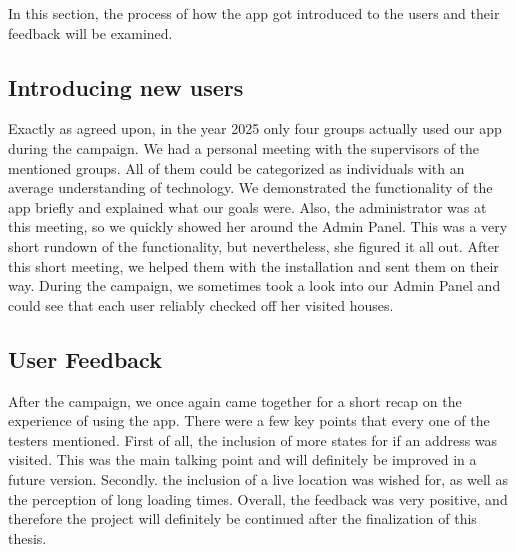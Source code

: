 \Author{\daAuthorTwo}

In this section, the process of how the app got introduced to the users and their feedback will be examined.

\subsection{Introducing new users}

Exactly as agreed upon, in the year 2025 only four groups actually used our app during the campaign. We had a personal meeting with the supervisors of the mentioned groups. All of them could be categorized as individuals with an average understanding of technology. We demonstrated the functionality of the app briefly and explained what our goals were. Also, the administrator was at this meeting, so we quickly showed her around the Admin Panel. This was a very short rundown of the functionality, but nevertheless, she figured it all out. After this short meeting, we helped them with the installation and sent them on their way. During the campaign, we sometimes took a look into our Admin Panel and could see that each user reliably checked off her visited houses.  

\subsection{User Feedback}

After the campaign, we once again came together for a short recap on the experience of using the app. There were a few key points that every one of the testers mentioned. First of all, the inclusion of more states for if an address was visited. This was the main talking point and will definitely be improved in a future version. Secondly. the inclusion of a live location was wished for, as well as the perception of long loading times. Overall, the feedback was very positive, and therefore the project will definitely be continued after the finalization of this thesis. 

\newpage